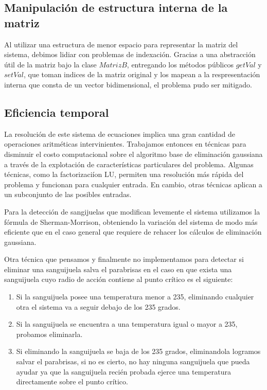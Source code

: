 \subsection{Manipulaci\'on de estructura interna de la matriz}

Al utilizar una estructura de menor espacio para representar la matriz del sistema, debimos lidiar con problemas de indexaci\'on. Gracias a una abstracci\'on \'util de la matriz bajo la clase $MatrizB$, entregando los m\'etodos p\'ublicos $getVal$ y $setVal$, que toman indices de la matriz original y los mapean a la respresentaci\'on interna que consta de un vector bidimensional, el problema pudo ser mitigado.

\subsection{Eficiencia temporal}

La resoluci\'on de este sistema de ecuaciones implica una gran cantidad de operaciones aritm\'eticas intervinientes. Trabajamos entonces en t\'ecnicas para disminuir el costo computacional sobre el algoritmo base de eliminaci\'on gaussiana a trav\'es de la explotaci\'on de caracter\'isticas particulares del problema.
Algunas t\'ecnicas, como la factorizaci\'ion LU, permiten una resoluci\'on m\'as r\'apida del problema y funcionan para cualquier entrada. En cambio, otras t\'ecnicas aplican a un subconjunto de las posibles entradas.

Para la detecci\'on de sangijuelas que modifican levemente el sistema utilizamos la f\'ormula de Sherman-Morrison, obteniendo la variaci\'on del sistema de modo m\'as eficiente que en el caso general que requiere de rehacer los c\'alculos de eliminaci\'on gaussiana.

Otra t\'ecnica que pensamos y finalmente no implementamos para detectar si eliminar una sanguijuela salva el parabrisas en el caso en que exista una sanguijuela cuyo radio de acci\'on contiene al punto cr\'itico es el siguiente:

\begin{enumerate}
 \item Si la sanguijuela posee una temperatura menor a 235, eliminando cualquier otra el sistema va a seguir debajo de los 235 grados.
 \item Si la sanguijuela se encuentra a una temperatura igual o mayor a 235, probamos eliminarla.
 \item Si eliminando la sanguijuela se baja de los 235 grados, eliminandola logramos salvar el parabrisas, si no es cierto, no hay ninguna sanguijuela que pueda ayudar ya que la sanguijuela reci\'en probada ejerce una temperatura directamente sobre el punto cr\'itico.
\end{enumerate}
